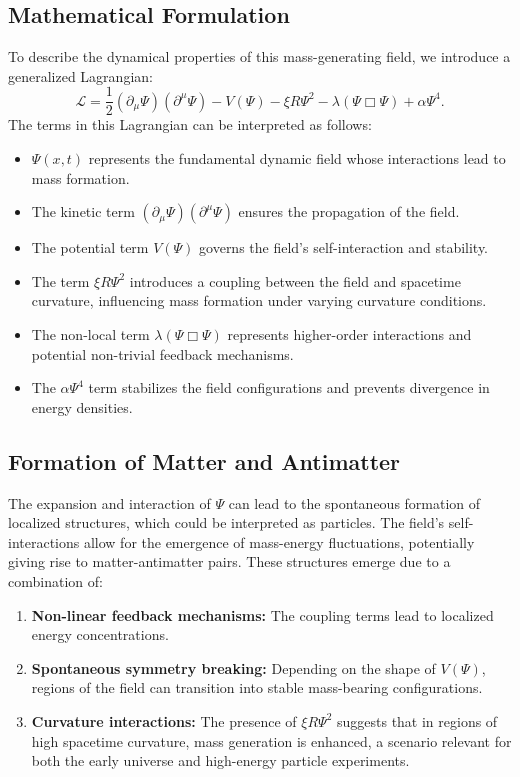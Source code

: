 \documentclass[a4paper,11pt]{article}
\begin{document}
\subsection{Mathematical Formulation}
To describe the dynamical properties of this mass-generating field, we introduce a generalized Lagrangian:
\begin{equation}
	\mathcal{L} = \frac{1}{2} (\partial_\mu \Psi)(\partial^\mu \Psi) - V(\Psi) - \xi R \Psi^2 - \lambda (\Psi \Box \Psi) + \alpha \Psi^4.
\end{equation}
The terms in this Lagrangian can be interpreted as follows:
\begin{itemize}
	\item $\Psi(x,t)$ represents the fundamental dynamic field whose interactions lead to mass formation.
	\item The kinetic term $(\partial_\mu \Psi)(\partial^\mu \Psi)$ ensures the propagation of the field.
	\item The potential term $V(\Psi)$ governs the field's self-interaction and stability.
	\item The term $\xi R \Psi^2$ introduces a coupling between the field and spacetime curvature, influencing mass formation under varying curvature conditions.
	\item The non-local term $\lambda (\Psi \Box \Psi)$ represents higher-order interactions and potential non-trivial feedback mechanisms.
	\item The $\alpha \Psi^4$ term stabilizes the field configurations and prevents divergence in energy densities.
\end{itemize}

\subsection{Formation of Matter and Antimatter}
The expansion and interaction of $\Psi$ can lead to the spontaneous formation of localized structures, which could be interpreted as particles. The field's self-interactions allow for the emergence of mass-energy fluctuations, potentially giving rise to matter-antimatter pairs. These structures emerge due to a combination of:
\begin{enumerate}
	\item \textbf{Non-linear feedback mechanisms:} The coupling terms lead to localized energy concentrations.
	\item \textbf{Spontaneous symmetry breaking:} Depending on the shape of $V(\Psi)$, regions of the field can transition into stable mass-bearing configurations.
	\item \textbf{Curvature interactions:} The presence of $\xi R \Psi^2$ suggests that in regions of high spacetime curvature, mass generation is enhanced, a scenario relevant for both the early universe and high-energy particle experiments.
\end{enumerate}
\end{document}
